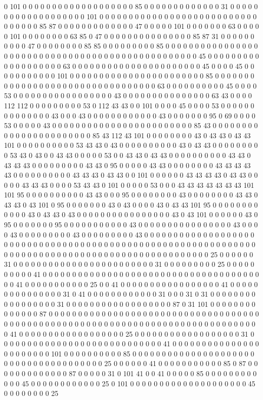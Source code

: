 0 101 0 0 0 0 0 0 0 0 0 0 0 0 0 0 0 0 0 0 0 85 0 0 0 0 0 0 0 0 0 0 0 0 0 31 0 0 0 0 0 0 0 0 0 0 0 0 0 0 0 0 0 0 0 101 0 0 0 0 0 0 0 0 0 0 0 0 0 0 0 0 0 0 0 0 0 0 0 0 0 0 0 0 0 0 0 0 0 85 87 0 0 0 0 0 0 0 0 0 0 0 0 0 47 0 0 0 0 0 101 0 0 0 0 0 0 0 63 0 0 0 0 0 101 0 0 0 0 0 0 0 0 63 85 0 47 0 0 0 0 0 0 0 0 0 0 0 0 0 0 0 85 87 31 0 0 0 0 0 0 0 0 0 0 47 0 0 0 0 0 0 0 0 85 85 0 0 0 0 0 0 0 0 0 85 0 0 0 0 0 0 0 0 0 0 0 0 0 0 0 0 0 0 0 0 0 0 0 0 0 0 0 0 0 0 0 0 0 0 0 0 0 0 0 0 0 0 0 0 0 0 0 0 0 45 0 0 0 0 0 0 0 0 0 0 0 0 0 0 0 0 0 0 0 63 0 0 0 0 0 0 0 0 0 0 0 0 0 0 0 0 0 0 0 0 0 0 45 0 0 0 0 45 0 0 0 0 0 0 0 0 0 0 0 101 0 0 0 0 0 0 0 0 0 0 0 0 0 0 0 0 0 0 0 0 0 0 0 85 0 0 0 0 0 0 0 0 0 0 0 0 0 0 0 0 0 0 0 0 0 0 0 0 0 0 0 0 0 0 0 0 0 63 0 0 0 0 0 0 0 0 0 0 45 0 0 0 0 53 0 0 0 0 0 0 0 0 0 0 0 0 0 0 0 0 0 43 0 0 0 0 0 0 0 0 0 0 0 0 0 0 0 63 43 0 0 0 0 112 112 0 0 0 0 0 0 0 0 0 53 0 112 43 43 0 0 101 0 0 0 0 45 0 0 0 0 53 0 0 0 0 0 0 0 0 0 0 0 0 0 0 43 0 0 0 43 0 0 0 0 0 0 0 0 0 0 0 0 43 0 0 0 0 0 0 0 95 0 69 0 0 0 0 53 0 0 0 0 0 43 0 0 0 0 0 0 0 0 0 0 0 0 0 0 0 0 0 0 0 0 0 0 0 0 85 43 0 0 0 0 0 0 0 0 0 0 0 0 0 0 0 0 0 0 0 0 0 0 0 85 43 112 43 101 0 0 0 0 0 0 0 0 43 0 43 43 0 43 43 101 0 0 0 0 0 0 0 0 0 0 53 43 43 0 43 0 0 0 0 0 0 0 0 0 0 43 0 43 43 0 0 0 0 0 0 0 0 0 53 43 0 43 0 0 43 43 0 0 0 0 0 53 0 0 43 43 0 43 43 0 0 0 0 0 0 0 0 0 0 43 43 0 43 43 43 0 0 0 0 0 0 0 0 0 43 43 0 95 0 0 0 0 0 43 43 0 0 0 0 0 0 0 0 43 43 43 43 43 0 0 0 0 0 0 0 0 0 0 43 43 43 0 43 43 0 0 101 0 0 0 0 0 0 43 43 43 43 0 43 43 0 0 0 0 0 43 43 43 0 0 0 0 53 43 43 0 101 0 0 0 0 0 53 0 0 0 43 43 43 43 43 43 43 101 101 95 0 0 0 0 0 0 0 0 0 0 43 43 0 0 0 95 0 0 0 0 0 0 0 0 43 0 0 0 0 0 0 0 0 43 43 0 43 43 0 43 101 0 95 0 0 0 0 0 0 0 43 0 43 0 0 0 0 43 0 43 43 101 95 0 0 0 0 0 0 0 0 0 0 0 0 43 0 43 43 0 43 0 0 0 0 0 0 0 0 0 0 0 0 0 0 0 0 43 0 43 101 0 0 0 0 0 0 43 0 95 0 0 0 0 0 0 0 95 0 0 0 0 0 0 0 0 0 0 0 43 0 0 0 0 0 0 0 0 0 0 0 0 0 0 0 0 43 0 0 0 0 43 0 0 0 0 0 0 0 0 0 43 0 0 0 0 0 0 0 0 0 43 0 0 0 0 0 0 0 0 0 0 0 0 0 0 0 0 0 0 0 0 0 0 0 0 0 0 0 0 0 0 0 0 0 0 0 0 0 0 0 0 0 0 0 0 0 0 0 0 0 0 0 0 0 0 0 0 0 0 0 0 0 0 0 0 0 0 0 0 0 0 0 0 0 0 0 0 0 0 0 0 0 0 0 0 0 0 0 0 0 0 0 0 0 0 0 0 0 25 0 0 0 0 0 0 31 0 0 0 0 0 0 0 0 0 0 0 0 0 0 0 0 0 0 0 0 0 0 0 0 31 0 0 0 0 0 0 0 0 0 25 0 0 0 0 0 0 0 0 0 0 41 0 0 0 0 0 0 0 0 0 0 0 0 0 0 0 0 0 0 0 0 0 0 0 0 0 0 0 0 0 0 0 0 0 0 0 0 0 0 0 41 0 0 0 0 0 0 0 0 0 0 0 25 0 0 41 0 0 0 0 0 0 0 0 0 0 0 0 0 0 0 0 0 41 0 0 0 0 0 0 0 0 0 0 0 0 0 0 0 31 0 41 0 0 0 0 0 0 0 0 0 0 0 0 31 0 0 0 31 0 31 0 0 0 0 0 0 0 0 0 0 0 0 0 0 0 0 0 31 0 0 0 0 0 0 0 0 0 0 0 0 0 0 0 0 0 0 87 0 31 101 0 0 0 0 0 0 0 0 0 0 0 0 0 0 87 0 0 0 0 0 0 0 0 0 0 0 0 0 0 0 0 0 0 0 0 0 0 0 0 0 0 0 0 0 0 0 0 0 0 0 0 0 0 0 0 0 0 0 0 0 0 0 0 0 0 0 0 0 0 0 0 0 0 0 0 0 0 0 0 0 0 0 0 0 0 0 0 0 0 0 0 0 0 0 0 41 0 0 0 0 0 0 0 0 0 0 0 0 0 0 0 0 0 0 25 0 0 0 0 0 0 0 0 0 0 0 0 0 0 0 0 0 0 31 0 0 0 0 0 0 0 0 0 0 0 0 0 0 0 0 0 0 0 0 0 0 0 0 0 0 0 0 41 0 0 0 0 0 0 0 0 0 0 0 0 0 0 0 0 0 0 0 0 0 0 0 101 0 0 0 0 0 0 0 0 0 0 85 0 0 0 0 0 0 0 0 0 0 0 0 0 0 0 0 0 0 0 0 0 0 0 0 0 0 0 0 0 0 0 0 0 0 0 0 0 0 25 0 0 0 0 0 0 41 0 0 0 0 0 0 0 0 0 0 0 85 0 87 0 0 0 0 0 0 0 0 0 0 0 0 0 87 0 0 0 0 0 31 0 101 41 0 0 41 0 0 0 0 0 85 0 0 0 0 0 0 0 0 0 0 0 0 45 0 0 0 0 0 0 0 0 0 0 0 0 25 0 101 0 0 0 0 0 0 0 0 0 0 0 0 0 0 0 0 0 0 0 0 45 0 0 0 0 0 0 0 0 25 